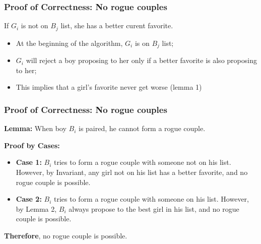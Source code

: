 \begin{frame}
  \frametitle{Proof of Correctness: No rogue couples}

  { If $G_i$ is not on $B_j$ list, she has a
    better curent favorite.

    \bigskip

    \begin{itemize}
      \item At the beginning of the algorithm, $G_i$ is on $B_j$ list;
      \item $G_i$ will reject a boy proposing to her only if a better favorite is also proposing to her;
      \item This implies that a girl's favorite never get worse (lemma 1)
    \end{itemize}
  }
\end{frame}

\begin{frame}
  \frametitle{Proof of Correctness: No rogue couples}

  {\larger

    {\bf Lemma:} When boy $B_i$ is paired, he cannot form a rogue
    couple.

    \bigskip

    {\bf Proof by Cases:}
    \begin{itemize}
    \item {\bf Case 1:} $B_i$ tries to form a rogue couple with
      someone not on his list. However, by \alert{Invariant}, any girl
      not on his list has a better favorite, and no rogue couple is
      possible.

    \item {\bf Case 2:} $B_i$ tries to form a rogue couple with
      someone on his list. However, by \alert{Lemma 2}, $B_i$ always
      propose to the best girl in his list, and no rogue couple is
      possible.
    \end{itemize}

    \bigskip

    {\bf Therefore}, no rogue couple is possible.

  }
\end{frame}

%
%
%
%
